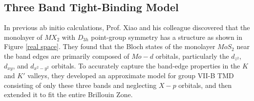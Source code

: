 \documentclass[12pt,english,a4paper]{article}
\begin{document}
	\subsection{Three Band Tight-Binding Model}
	\quad In previous ab initio calculations\cite{xiao_coupled_2012}, Prof. Xiao and his colleague discovered that the monolayer of $MX_2$ with $D_{3h}$ point-group symmetry has a structure as shown in Figure \ref{real space}. They found that the Bloch states of the monolayer $MoS_2$ near the band edges are primarily composed of $Mo-d$ orbitals, particularly the $d_{z^2}$, $d_{xy}$, and $d_{x^2-y^2}$ orbitals. To accurately capture the band-edge properties in the $K$ and $K'$ valleys, they developed an approximate model for group VII-B TMD consisting of only these three bands and neglecting $X-p$ orbitals, and then extended it to fit the entire Brillouin Zone\cite{liu_three-band_2013}.
\end{document}
